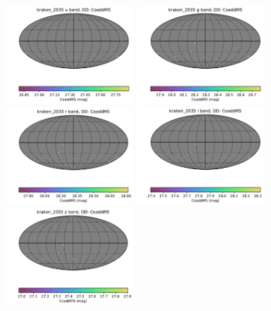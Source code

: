 \documentclass[DM,lsstdraft,authoryear,toc]{lsstdoc}
\begin{document}
\begin{figure}[ht]
\centering
\includegraphics[width=0.43\textwidth]{figures/kraken_2035_CoaddM5_u_band_DD_HEAL_SkyMap.pdf}
\includegraphics[width=0.43\textwidth]{figures/kraken_2035_CoaddM5_g_band_DD_HEAL_SkyMap.pdf} \\
\includegraphics[width=0.43\textwidth]{figures/kraken_2035_CoaddM5_r_band_DD_HEAL_SkyMap.pdf}
\includegraphics[width=0.43\textwidth]{figures/kraken_2035_CoaddM5_i_band_DD_HEAL_SkyMap.pdf} \\
\includegraphics[width=0.43\textwidth]{figures/kraken_2035_CoaddM5_z_band_DD_HEAL_SkyMap.pdf}

\end{figure}
\end{document}
